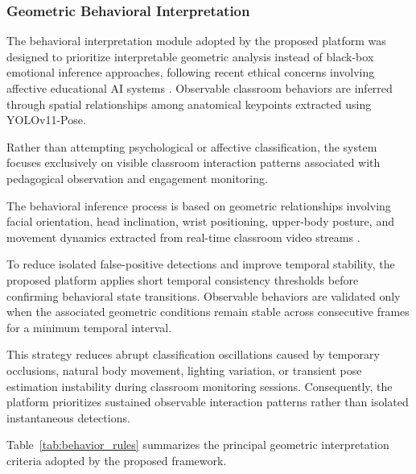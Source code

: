 \documentclass[12pt,a4paper]{article}
\begin{document}
\FloatBarrier

\subsubsection{Geometric Behavioral Interpretation}

The behavioral interpretation module adopted by the proposed platform was designed to prioritize interpretable geometric analysis instead of black-box emotional inference approaches, following recent ethical concerns involving affective educational AI systems \cite{xiaoOcclusionRobustCognitive2024,trabelsiRealTimeAttentionMonitoring2023a}. Observable classroom behaviors are inferred through spatial relationships among anatomical keypoints extracted using YOLOv11-Pose.

Rather than attempting psychological or affective classification, the system focuses exclusively on visible classroom interaction patterns associated with pedagogical observation and engagement monitoring.

The behavioral inference process is based on geometric relationships involving facial orientation, head inclination, wrist positioning, upper-body posture, and movement dynamics extracted from real-time classroom video streams \cite{yangStudentClassroomBehavior2024,chenStudentBehaviorDetection2023}.

To reduce isolated false-positive detections and improve temporal stability, the proposed platform applies short temporal consistency thresholds before confirming behavioral state transitions. Observable behaviors are validated only when the associated geometric conditions remain stable across consecutive frames for a minimum temporal interval.

This strategy reduces abrupt classification oscillations caused by temporary occlusions, natural body movement, lighting variation, or transient pose estimation instability during classroom monitoring sessions. Consequently, the platform prioritizes sustained observable interaction patterns rather than isolated instantaneous detections.

Table~\ref{tab:behavior_rules} summarizes the principal geometric interpretation criteria adopted by the proposed framework.
\end{document}
